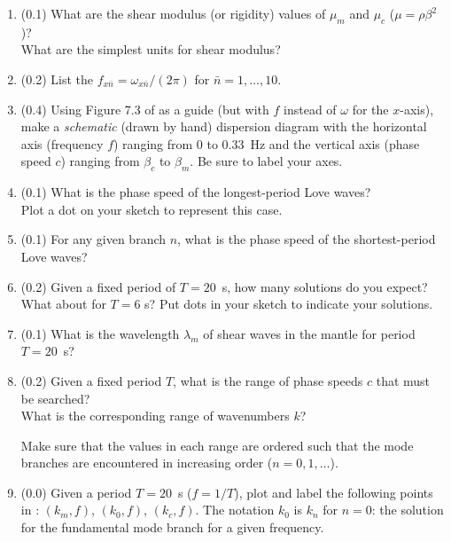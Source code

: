 \documentclass[11pt,titlepage,fleqn]{article}
\newcommand{\cutoff}[1]{{#1}_{x\bar{n}}}
\begin{document}
\begin{enumerate}
\begin{enumerate}
\item (0.1) What are the shear modulus (or rigidity) values of $\mu_m$ and $\mu_c$ ($\mu = \rho\beta^2$)? \\
What are the simplest units for shear modulus?

\item (0.2) List the $\cutoff{f} = \cutoff{\omega}/(2\pi)$ for $\bar{n}=1,\ldots,10$.

\item (0.4) Using Figure 7.3 of \citet{AkiRichardsE2} as a guide (but with $f$ instead of $\omega$ for the $x$-axis), make a {\em schematic} (\ie drawn by hand) dispersion diagram with the horizontal axis (frequency $f$) ranging from 0 to 0.33~Hz and the vertical axis (phase speed $c$) ranging from $\beta_c$ to $\beta_m$. Be sure to label your axes.

\item (0.1) What is the phase speed of the longest-period Love waves? \\
Plot a dot on your sketch to represent this case.

\item (0.1) For any given branch $n$, what is the phase speed of the shortest-period Love waves?

\item (0.2) Given a fixed period of $T = 20$~s, how many solutions do you expect? \\
What about for $T = 6$ s? Put dots in your sketch to indicate your solutions.

\item (0.1) What is the wavelength $\lambda_m$ of shear waves in the mantle for period $T = 20$~s?

\item (0.2) Given a fixed period $T$, what is the range of phase speeds $c$ that must be searched? \\
What is the corresponding range of wavenumbers $k$?

Make sure that the values in each range are ordered such that the mode branches are encountered in increasing order ($n = 0,1,\ldots$).

\item (0.0) Given a period $T = 20$~s ($f = 1/T$), plot and label the following points in : $(k_m, f)$, $(k_0, f)$, $(k_c, f)$. The notation $k_0$ is $k_n$ for $n=0$: the solution for the fundamental mode branch for a given frequency.


\end{enumerate}
\end{enumerate}
\end{document}
